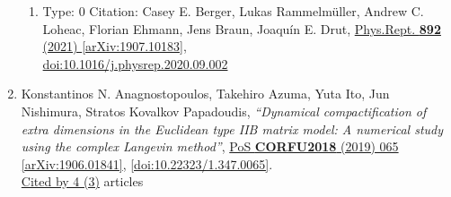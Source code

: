 \documentclass[a4paper,10pt]{article}
\begin{document}
\begin{enumerate}
\begin{enumerate}
  \item Type: 0 Citation: Casey E. Berger, Lukas Rammelmüller, Andrew C. Loheac, Florian Ehmann, Jens Braun, Joaquín E. Drut, \href{https://www.doi.org/10.1016/j.physrep.2020.09.002}{Phys.Rept. {\bf 892} (2021) }  \href{https://arxiv.org/abs/1907.10183}{[arXiv:1907.10183]},\\\href{https://www.doi.org/10.1016/j.physrep.2020.09.002}{doi:10.1016/j.physrep.2020.09.002}
\end{enumerate}
\item Konstantinos N. Anagnostopoulos, Takehiro Azuma, Yuta Ito, Jun Nishimura, Stratos Kovalkov Papadoudis, {\it ``Dynamical compactification of extra dimensions in the Euclidean type IIB matrix model: A numerical study using the complex Langevin method''}, \href{https://www.doi.org/10.22323/1.347.0065}{PoS {\bf CORFU2018} (2019) 065} \href{https://arxiv.org/abs/1906.01841}{[arXiv:1906.01841]}, \href{https://www.doi.org/10.22323/1.347.0065}{[doi:10.22323/1.347.0065]}.
\\\href{https://inspirehep.net/literature/?q=refersto%3Arecid%3A1738534}{Cited by 4 (3)} articles


\end{enumerate}
\end{document}
